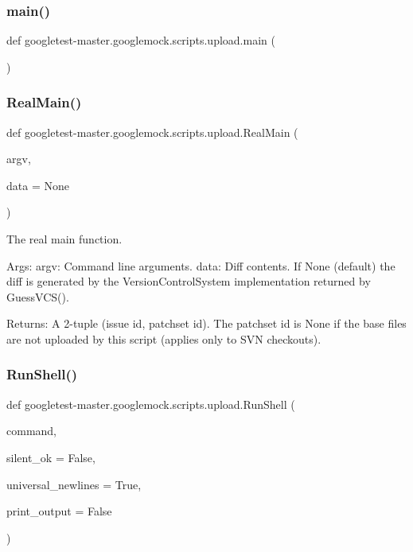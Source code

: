 \subsubsection{\texorpdfstring{main()}{main()}}
{\footnotesize\ttfamily def googletest-\/master.\+googlemock.\+scripts.\+upload.\+main (\begin{DoxyParamCaption}{ }\end{DoxyParamCaption})}

\mbox{\label{namespacegoogletest-master_1_1googlemock_1_1scripts_1_1upload_ac030650e3c90bac0be16eb64ce4f0a91}} 
\subsubsection{\texorpdfstring{RealMain()}{RealMain()}}
{\footnotesize\ttfamily def googletest-\/master.\+googlemock.\+scripts.\+upload.\+Real\+Main (\begin{DoxyParamCaption}\item[{}]{argv,  }\item[{}]{data = {\ttfamily None} }\end{DoxyParamCaption})}

\begin{DoxyVerb}The real main function.

Args:
  argv: Command line arguments.
  data: Diff contents. If None (default) the diff is generated by
    the VersionControlSystem implementation returned by GuessVCS().

Returns:
  A 2-tuple (issue id, patchset id).
  The patchset id is None if the base files are not uploaded by this
  script (applies only to SVN checkouts).
\end{DoxyVerb}
 \mbox{\label{namespacegoogletest-master_1_1googlemock_1_1scripts_1_1upload_aeaf8df05437f41f4282d84e90b40ac7d}} 
\subsubsection{\texorpdfstring{RunShell()}{RunShell()}}
{\footnotesize\ttfamily def googletest-\/master.\+googlemock.\+scripts.\+upload.\+Run\+Shell (\begin{DoxyParamCaption}\item[{}]{command,  }\item[{}]{silent\+\_\+ok = {\ttfamily False},  }\item[{}]{universal\+\_\+newlines = {\ttfamily True},  }\item[{}]{print\+\_\+output = {\ttfamily False} }\end{DoxyParamCaption})}

